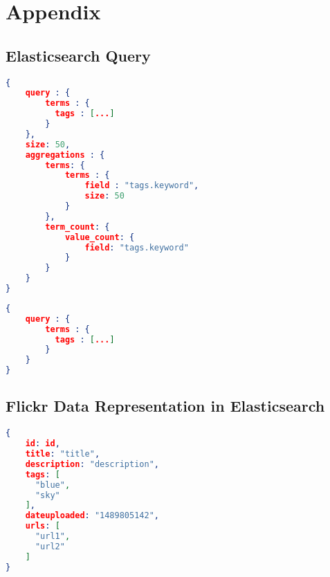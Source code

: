 \chapter{Appendix}

\section{Elasticsearch Query}
\begin{lstlisting}[language=json, caption={Initial query to retrive query expansion data}, label={ap:initial-query}]
{
    query : {
        terms : {
          tags : [...]
        }
    },
    size: 50,
    aggregations : {
        terms: {
            terms : {
                field : "tags.keyword",
                size: 50
            }
        },
        term_count: {
            value_count: {
                field: "tags.keyword"
            }
        }
    }
}
\end{lstlisting}

\begin{lstlisting}[language=json, caption={Elasticsearch term search}, label={ap:final-query}]
{
    query : {
        terms : {
          tags : [...]
        }
    }
}
\end{lstlisting}

\section{Flickr Data Representation in Elasticsearch}
\begin{lstlisting}[language={json}, caption={Internal photo data representation in elasticsearch}, label={ap:flickr-data}]
{
    id: id,
    title: "title",
    description: "description",
    tags: [
      "blue",
      "sky"
    ],
    dateuploaded: "1489805142",
    urls: [
      "url1",
      "url2"
    ]
}
\end{lstlisting}

